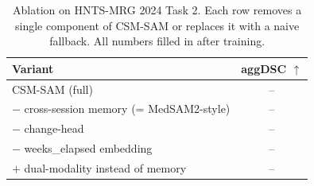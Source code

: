 \begin{table}[t]
\centering
\caption{Ablation on HNTS-MRG 2024 Task 2. Each row removes a single
component of CSM-SAM or replaces it with a naive fallback. All numbers
filled in after training.}
\label{tab:ablation}
\small
\begin{tabular}{lc}
\toprule
Variant & aggDSC $\uparrow$ \\
\midrule
CSM-SAM (full)                                       & -- \\ %
\quad $-$ cross-session memory (= MedSAM2-style)     & -- \\ %
\quad $-$ change-head                                & -- \\ %
\quad $-$ weeks\_elapsed embedding                   & -- \\ %
\quad $+$ dual-modality instead of memory            & -- \\ %
\bottomrule
\end{tabular}
\end{table}
